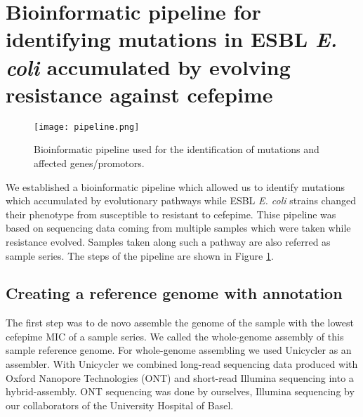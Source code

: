 \section{Bioinformatic pipeline for identifying mutations in ESBL \textit{E. coli} accumulated by evolving resistance against cefepime}
\label{section:pipeline}
\begin{figure}
	\texttt{[image: pipeline.png]}
	\caption{Bioinformatic pipeline used for the identification of mutations and affected genes/promotors.}
	\label{figure:pipeline}
\end{figure}
We established a bioinformatic pipeline which allowed us to identify mutations which accumulated by evolutionary pathways while ESBL \textit{E. coli} strains changed their phenotype from susceptible to resistant to cefepime. Thise pipeline was based on sequencing data coming from multiple samples which were taken while resistance evolved. Samples taken along such a pathway are also referred as sample series. The steps of the pipeline are shown in Figure \ref{figure:pipeline}.

\subsection{Creating a reference genome with annotation} 
The first step was to de novo assemble the genome of the sample with the lowest cefepime MIC of a sample series. We called the whole-genome assembly of this sample reference genome. For whole-genome assembling we used Unicycler \cite{wick_unicycler:_2017} as an assembler. With Unicycler \cite{wick_unicycler:_2017} we combined long-read sequencing data produced with Oxford Nanopore Technologies (ONT) and short-read Illumina sequencing into a hybrid-assembly. ONT sequencing was done by ourselves, Illumina sequencing by our collaborators of the University Hospital of Basel.  

